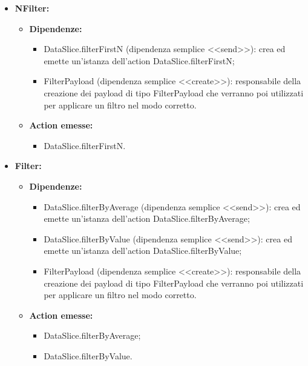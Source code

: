 \begin{itemize}
      \item \textbf{NFilter:}
            \begin{itemize}
                  \item \textbf{Dipendenze:}
                        \begin{itemize}
                              \item DataSlice.filterFirstN (dipendenza semplice <<send>>): crea ed emette
                                    un'istanza dell'action DataSlice.filterFirstN;
                              \item FilterPayload (dipendenza semplice <<create>>): responsabile della creazione
                                    dei payload di tipo FilterPayload che verranno poi utilizzati per applicare un
                                    filtro nel modo corretto.
                        \end{itemize}
                  \item \textbf{Action emesse:}
                        \begin{itemize}
                              \item DataSlice.filterFirstN.
                        \end{itemize}
            \end{itemize}

      \item \textbf{Filter:}
            \begin{itemize}
                  \item \textbf{Dipendenze:}
                        \begin{itemize}
                              \item DataSlice.filterByAverage (dipendenza semplice <<send>>): crea ed emette
                                    un'istanza dell'action DataSlice.filterByAverage;
                              \item DataSlice.filterByValue (dipendenza semplice <<send>>): crea ed emette
                                    un'istanza dell'action DataSlice.filterByValue;
                              \item FilterPayload (dipendenza semplice <<create>>): responsabile della creazione
                                    dei payload di tipo FilterPayload che verranno poi utilizzati per applicare un
                                    filtro nel modo corretto.
                        \end{itemize}
                  \item \textbf{Action emesse:}
                        \begin{itemize}
                              \item DataSlice.filterByAverage;
                              \item DataSlice.filterByValue.
                        \end{itemize}
            \end{itemize}


\end{itemize}
